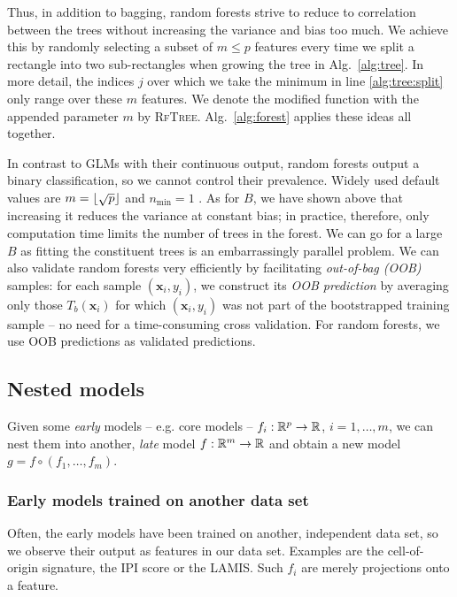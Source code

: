 Thus, in addition to bagging, random forests strive to reduce to correlation between the trees 
without increasing the variance and bias too much. We achieve this by randomly selecting a subset
of $m \leq p$ features every time we split a rectangle into two sub-rectangles when growing the 
tree in Alg.\ \ref{alg:tree}. In more detail, the indices $j$ over which we take the minimum in 
line \ref{alg:tree:split} only range over 
these $m$ features. We denote the modified function with the appended parameter $m$ by 
\textsc{RfTree}. Alg.\ \ref{alg:forest} applies these ideas all together.



In contrast to GLMs with their continuous output, random forests output a binary classification,
so we cannot control their prevalence. Widely used default values are $m = \lfloor\sqrt{p}\rfloor$ and 
$n_\text{min} = 1$ \cite{breiman01}. As for $B$, we have 
shown above that increasing it reduces the variance at constant bias; in practice, therefore, only 
computation time limits the number of trees in the forest. We can go for a large $B$ as fitting the 
constituent trees is an embarrassingly parallel problem. We can 
also validate random forests very efficiently by facilitating \textit{out-of-bag (OOB)} samples: 
for each sample $(\mathbf{x}_i, y_i)$, we construct its \textit{OOB prediction} by averaging only 
those $T_b(\mathbf{x}_i)$ for which $(\mathbf{x}_i, y_i)$ was not part of the bootstrapped training 
sample -- no need for a time-consuming cross validation. For random forests, we use OOB predictions 
as validated predictions.

\subsection{Nested models}\label{subsec:nested-models}

Given some \textit{early} models -- e.g. core models -- $f_i: \mathbb{R}^p \to \mathbb{R}$, $i = 1, \ldots, m$, 
we can nest them into another, \textit{late} model $f: \mathbb{R}^m \to \mathbb{R}$ and obtain a new model 
$g = f \circ (f_1, \ldots, f_m)$. 

\subsubsection{Early models trained on another data set}
Often, the early models have been trained on another, independent data set, so we observe their 
output as features in our data set. Examples are the cell-of-origin signature, the IPI score or the 
LAMIS. Such $f_i$ are merely projections onto a feature.

